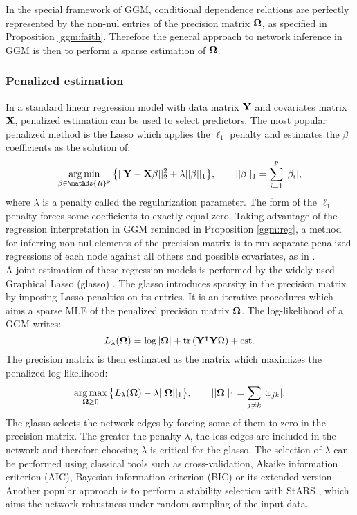 In the special framework of GGM, conditional dependence relations are perfectly represented by the non-nul entries of the precision matrix ${\boldsymbol{\Omega}}$, as specified in Proposition \ref{ggm:faith}. Therefore the general approach to network inference in GGM is then to perform a sparse estimation of ${\boldsymbol{\Omega}}$.

 \subsubsection{Penalized estimation}
 In a standard linear regression model with data matrix ${\bf Y}$ and covariates matrix ${\bf X}$, penalized estimation can be used to select predictors. The most popular penalized method is the Lasso \citep{lasso} which applies the $\ell_1$ penalty and estimates the $\beta$ coefficients as the solution of:
 $$\argmin_{\beta \in \mathds{R}^p} \big\{ ||\Yb - \Xb\beta ||^2_2 + \lambda ||\beta||_1\big\}, \qquad ||\beta||_1=\sum_{i=1}^p |\beta_i|,$$
 where $\lambda$ is a penalty called the regularization parameter.  The form of the $\ell_1$ penalty forces some coefficients to exactly equal zero. Taking advantage of the regression interpretation in GGM reminded in Proposition \ref{ggm:reg}, a method for inferring non-nul elements of the precision matrix is to run separate penalized regressions of each node against all others and possible covariates, as in \citet{MeB06}. \\
 
 A joint estimation of these regression models is performed by the widely used Graphical Lasso (glasso) \citep{glasso}. The glasso introduces sparsity in the precision matrix by imposing Lasso penalties on its entries. It is an iterative procedures which aims a sparse MLE of the penalized precision matrix ${\boldsymbol{\Omega}}$.  The log-likelihood of a GGM writes:
 $$L_\lambda({\boldsymbol{\Omega}}) = \log |{\boldsymbol{\Omega}}| +\rm tr\left( {\bf Y}^\intercal {\bf Y} {\boldsymbol{\Omega}} \right)+cst .$$
 The precision matrix is then estimated as the matrix which maximizes the penalized log-likelihood:
 $$\operatorname*{arg\,max}_{{\boldsymbol{\Omega}}\geq 0} \big\{L_\lambda({\boldsymbol{\Omega}}) - \lambda ||{\boldsymbol{\Omega}}||_1\big\}, \qquad ||{\boldsymbol{\Omega}}||_1 = \sum_{j\neq k} |\omega_{jk}|.$$
The glasso  selects the network edges by forcing some of them to zero in the precision matrix. The greater the penalty $\lambda$, the less edges are included in the network and therefore choosing $\lambda$ is critical for the glasso. The selection of $\lambda$ can be performed using classical tools such as cross-validation, Akaike information criterion (AIC),  Bayesian information criterion (BIC) or its extended version.  Another popular approach is to perform a stability selection with StARS \citep{stars}, which aims the network robustness under random sampling of the input data.

